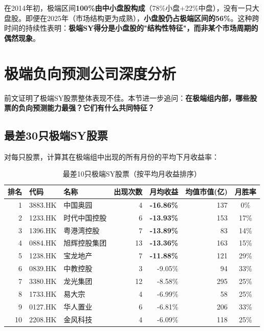 \documentclass[10pt,a4paper]{ctexart}
\begin{document}
在2014年初，极端区间\textbf{100\%由中小盘股构成}（78\%小盘+22\%中盘），没有一只大盘股。即便在2025年（市场结构更为成熟），\textbf{小盘股仍占极端区间的56\%}。这种跨时间的持续性表明：\textbf{极端SY得分是小盘股的"结构性特征"，而非某个市场周期的偶然现象}。

\section{极端负向预测公司深度分析}

前文证明了极端SY股票整体表现不佳。本节进一步追问：\textbf{在极端组内部，哪些股票的负向预测能力最强？它们有什么共同特征？}

\subsection{最差30只极端SY股票}

对每只股票，计算其在极端组中出现的所有月份的平均下月收益率：

\begin{table}[htbp]
\centering
\caption{最差10只极端SY股票（按平均月收益排序）}
\begin{tabular}{rllrrrc}
\toprule
\textbf{排名} & \textbf{代码} & \textbf{名称} & \textbf{出现次数} & \textbf{月均收益} & \textbf{均值市值(亿)} & \textbf{月胜率} \\
\midrule
1 & 3883.HK & 中国奥园 & 4 & \textbf{-16.86\%} & 137 & 0\% \\
2 & 1233.HK & 时代中国控股 & 6 & \textbf{-13.93\%} & 153 & 17\% \\
3 & 1396.HK & 粤港湾控股 & 7 & \textbf{-13.89\%} & 83 & 14\% \\
4 & 0884.HK & 旭辉控股集团 & 13 & \textbf{-13.36\%} & 163 & 15\% \\
5 & 1238.HK & 宝龙地产 & 7 & \textbf{-11.88\%} & 121 & 29\% \\
6 & 0839.HK & 中教控股 & 3 & -9.05\% & 94 & 33\% \\
7 & 3380.HK & 龙光集团 & 12 & -8.58\% & 295 & 25\% \\
8 & 1733.HK & 易大宗 & 4 & -6.99\% & 58 & 25\% \\
9 & 0127.HK & 华人置业 & 6 & -6.81\% & 206 & 33\% \\
10 & 2208.HK & 金风科技 & 4 & -6.09\% & 118 & 25\% \\
\bottomrule
\end{tabular}
\end{table}
\end{document}
